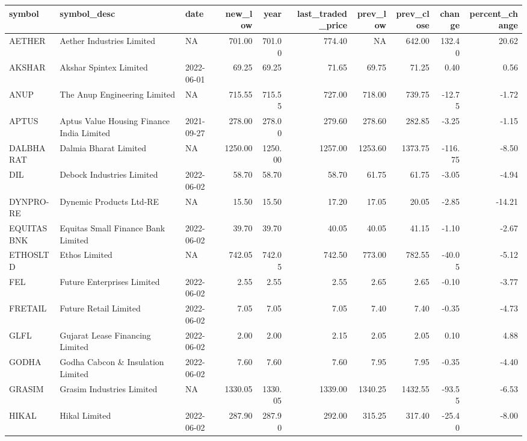 \documentclass[
]{article}
\begin{document}
\begin{table}
\centering\begingroup\fontsize{12}{14}\selectfont

\begin{tabular}{l|l|l|r|r|r|r|r|r|r}
\hline
symbol & symbol\_desc & date & new\_low & year & last\_traded\_price & prev\_low & prev\_close & change & percent\_change\\
\hline
AETHER & Aether Industries Limited & NA & 701.00 & 701.00 & 774.40 & NA & 642.00 & 132.40 & 20.62\\
\hline
AKSHAR & Akshar Spintex Limited & 2022-06-01 & 69.25 & 69.25 & 71.65 & 69.75 & 71.25 & 0.40 & 0.56\\
\hline
ANUP & The Anup Engineering Limited & NA & 715.55 & 715.55 & 727.00 & 718.00 & 739.75 & -12.75 & -1.72\\
\hline
APTUS & Aptus Value Housing Finance India Limited & 2021-09-27 & 278.00 & 278.00 & 279.60 & 278.60 & 282.85 & -3.25 & -1.15\\
\hline
DALBHARAT & Dalmia Bharat Limited & NA & 1250.00 & 1250.00 & 1257.00 & 1253.60 & 1373.75 & -116.75 & -8.50\\
\hline
DIL & Debock Industries Limited & 2022-06-02 & 58.70 & 58.70 & 58.70 & 61.75 & 61.75 & -3.05 & -4.94\\
\hline
DYNPRO-RE & Dynemic Products Ltd-RE & NA & 15.50 & 15.50 & 17.20 & 17.05 & 20.05 & -2.85 & -14.21\\
\hline
EQUITASBNK & Equitas Small Finance Bank Limited & 2022-06-02 & 39.70 & 39.70 & 40.05 & 40.05 & 41.15 & -1.10 & -2.67\\
\hline
ETHOSLTD & Ethos Limited & NA & 742.05 & 742.05 & 742.50 & 773.00 & 782.55 & -40.05 & -5.12\\
\hline
FEL & Future Enterprises Limited & 2022-06-02 & 2.55 & 2.55 & 2.55 & 2.65 & 2.65 & -0.10 & -3.77\\
\hline
FRETAIL & Future Retail Limited & 2022-06-02 & 7.05 & 7.05 & 7.05 & 7.40 & 7.40 & -0.35 & -4.73\\
\hline
GLFL & Gujarat Lease Financing Limited & 2022-06-02 & 2.00 & 2.00 & 2.15 & 2.05 & 2.05 & 0.10 & 4.88\\
\hline
GODHA & Godha Cabcon \& Insulation Limited & 2022-06-02 & 7.60 & 7.60 & 7.60 & 7.95 & 7.95 & -0.35 & -4.40\\
\hline
GRASIM & Grasim Industries Limited & NA & 1330.05 & 1330.05 & 1339.00 & 1340.25 & 1432.55 & -93.55 & -6.53\\
\hline
HIKAL & Hikal Limited & 2022-06-02 & 287.90 & 287.90 & 292.00 & 315.25 & 317.40 & -25.40 & -8.00\\

\end{tabular}
\end{table}
\end{document}

